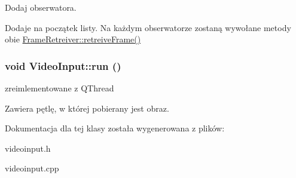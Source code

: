 Dodaj obserwatora. 

Dodaje na początek listy. Na każdym obserwatorze zostaną wywołane metody obie \hyperlink{class_frame_retreiver_a061c97e43f3b73705903e49afad3e5bf}{FrameRetreiver::retreiveFrame()} \hypertarget{class_video_input_a653a4568756629a94a3b6e2697973864}{
\subsubsection[{run}]{\setlength{\rightskip}{0pt plus 5cm}void VideoInput::run ()}}
\label{class_video_input_a653a4568756629a94a3b6e2697973864}


zreimlementowane z QThread 

Zawiera pętlę, w której pobierany jest obraz. 

Dokumentacja dla tej klasy została wygenerowana z plików:\begin{DoxyCompactItemize}
\item 
videoinput.h\item 
videoinput.cpp\end{DoxyCompactItemize}
